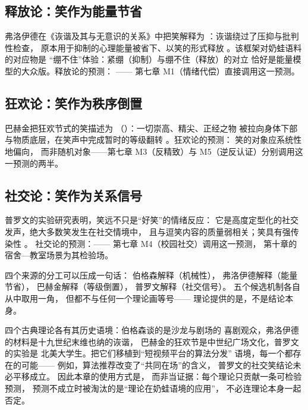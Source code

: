 \subsection{释放论：笑作为能量节省}

弗洛伊德在《诙谐及其与无意识的关系》中把笑解释为
：诙谐绕过了压抑与批判性检查，
原本用于抑制的心理能量被省下、以笑的形式释放
\cite{freud1905witz}。该框架对奶蛙语料的对应物是
“绷不住”体验：紧绷（抑制）与绷不住（释放）的对立
恰好是能量模型的大众版。释放论的预测：
——
第七章 M1（情绪代偿）直接调用这一预测。

\subsection{狂欢论：笑作为秩序倒置}

巴赫金把狂欢节式的笑描述为
（）：一切崇高、精尖、正经之物
被拉向身体下部与物质底层，在笑声中完成暂时的等级翻转
\cite{bakhtin1968rabelais}。狂欢论的预测：
笑的对象应系统性地偏向，
而非随机对象——第七章 M3（反精致）与
M5（逆反认证）分别调用这一预测的两半。

\subsection{社交论：笑作为关系信号}

普罗文的实验研究表明，笑远不只是“好笑”的情绪反应：
它是高度定型化的社交发声，绝大多数笑发生在社交情境中，
且与逗笑内容的质量弱相关；笑具有强传染性
\cite{provine1992laughter,provine2000laughter}。
社交论的预测：——
第七章 M4（校园社交）调用这一预测，
第十章的宿舍—教室场景为其检验场。

四个来源的分工可以压成一句话：
伯格森解释（机械性），
弗洛伊德解释（能量节省），
巴赫金解释（等级倒置），
普罗文解释（社交信号）。
五个候选机制各自从中取用一角，
但都不与任何一个理论画等号——
理论提供的是，不是结论本身。

\begin{nlcritique}
  四个古典理论各有其历史语境：伯格森谈的是沙龙与剧场的
  喜剧观众，弗洛伊德的材料是十九世纪末维也纳的诙谐，
  巴赫金的狂欢节是中世纪广场文化，普罗文的实验是
  北美大学生。把它们移植到“短视频平台的算法分发”
  语境，每一个都存在的可能——
  例如，算法推荐改变了“共同在场”的含义，
  普罗文的社交笑结论未必平移成立。
  因此本章的使用方式是，
  而非当证据：每个理论只贡献一条可检验预测，
  预测不成立时被淘汰的是“理论在奶蛙语境的应用”，
  不必连理论本身一起否定。
\end{nlcritique}


